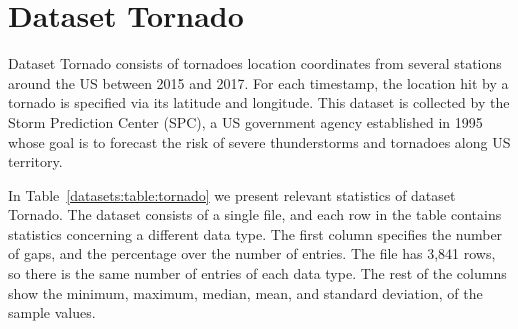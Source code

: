 
\clearpage
\section{Dataset Tornado}
\label{datasets:tornado}

Dataset Tornado \cite{dataset:spc} consists of tornadoes location coordinates from several stations around the US between 2015 and 2017. For each timestamp, the location hit by a tornado is specified via its latitude and longitude. This dataset is collected by the Storm Prediction Center (SPC), a US government agency established in 1995 whose goal is to forecast the risk of severe thunderstorms and tornadoes along US territory.


In Table~\ref{datasets:table:tornado} we present relevant statistics of dataset Tornado. The dataset consists of a single file, and each row in the table contains statistics concerning a different data type. The first column specifies the number of gaps, and the percentage over the number of entries. The file has 3,841 rows, so there is the same number of entries of each data type. The rest of the columns show the minimum, maximum, median, mean, and standard deviation, of the sample values.




